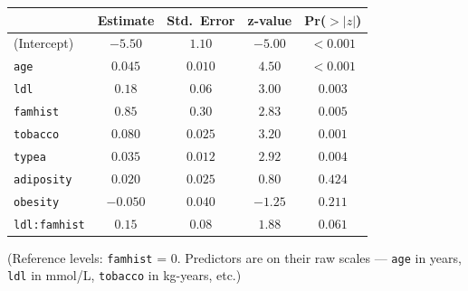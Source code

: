 \documentclass[11pt,a4paper]{article}
\begin{document}
\begin{center}\small
\begin{tabular}{lcccc}
\toprule
 & \textbf{Estimate} & \textbf{Std.\ Error} & \textbf{z-value} & \textbf{Pr($>|z|$)} \\
\midrule
(Intercept)             & $-5.50$  & $1.10$  & $-5.00$ & $<0.001$ \\
\texttt{age}            & $0.045$  & $0.010$ & $4.50$  & $<0.001$ \\
\texttt{ldl}            & $0.18$   & $0.06$  & $3.00$  & $0.003$  \\
\texttt{famhist}        & $0.85$   & $0.30$  & $2.83$  & $0.005$  \\
\texttt{tobacco}        & $0.080$  & $0.025$ & $3.20$  & $0.001$  \\
\texttt{typea}          & $0.035$  & $0.012$ & $2.92$  & $0.004$  \\
\texttt{adiposity}      & $0.020$  & $0.025$ & $0.80$  & $0.424$  \\
\texttt{obesity}        & $-0.050$ & $0.040$ & $-1.25$ & $0.211$  \\
\texttt{ldl:famhist}    & $0.15$   & $0.08$  & $1.88$  & $0.061$  \\
\bottomrule
\end{tabular}
\end{center}

\noindent (Reference levels: \texttt{famhist} = $0$. Predictors are on their raw scales --- \texttt{age} in years, \texttt{ldl} in mmol/L, \texttt{tobacco} in kg-years, etc.)
\end{document}
